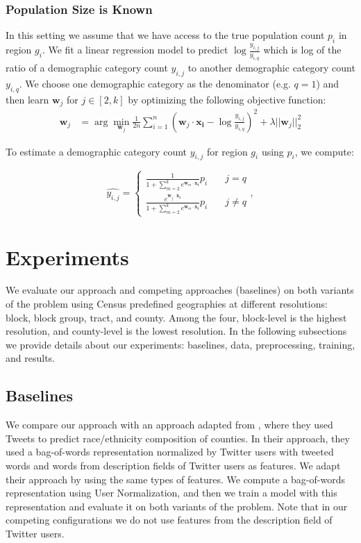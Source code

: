 \documentclass[letterpaper]{article}
\begin{document}
\subsubsection{Population Size is Known} In this setting we assume that we have access to the true population count $p_i$ in region $g_i$. We fit a linear regression model to predict $\log \frac{y_{i,j}}{y_{i,q}}$ which is log of the ratio of a demographic category count $y_{i,j}$ to another demographic category count $y_{i,q}$. We choose one demographic category as the denominator (e.g. $q=1$) and then learn $\mathbf{w}_j$ for $j \in [2,k]$ by optimizing the following objective function:
\begin{align*}
    \mathbf{w}_j &= \arg\min\limits_{\mathbf{w}_j} \frac{1}{2n} \sum_{i=1}^{n} (\mathbf{w}_j\cdot\mathbf{x_i} - \log \frac{y_{i,j}}{y_{i,q}} )^2 + \lambda||\mathbf{w}_j||_2^2
\end{align*}

To estimate a demographic category count $y_{i,j}$ for region $g_i$ using $p_i$, we compute:

\[
\hat{y_{i,j}} = \left\{
        \begin{array}{ll}
            \frac{1}{1 + \sum_{m=2}^{k} e^{\mathbf{w}_m\cdot\mathbf{x_i}}} p_i & \quad j=q \\[1em]
            \frac{e^{\mathbf{w}_j\cdot\mathbf{x_i}}}{1 + \sum_{m=2}^{k} e^{\mathbf{w}_m\cdot\mathbf{x_i} }} p_i & \quad j\neq q
        \end{array}
    \right.,
\]

\section{Experiments}

We evaluate our approach and competing approaches (baselines) on both variants of the problem using Census predefined geographies at different resolutions: block, block group, tract, and county. Among the four, block-level is the highest resolution, and county-level is the lowest resolution. In the following subsections we provide details about our experiments: baselines, data, preprocessing, training, and results.

\subsection{Baselines}
We compare our approach with an approach adapted from \cite{mohammady2014using}, where they used Tweets to predict race/ethnicity composition of counties. In their approach, they used a bag-of-words representation normalized by Twitter users with tweeted words and words from description fields of Twitter users as features. We adapt their approach by using the same types of features. We compute a bag-of-words representation using User Normalization, and then we train a model with this representation and evaluate it on both variants of the problem. Note that in our competing configurations we do not use features from the description field of Twitter users.
\end{document}
